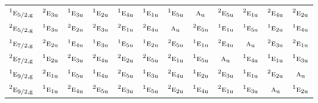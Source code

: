 \documentclass[10pt,a4paper]{article}
\numberwithin{equation}{section}
\newcommand{\irr}[1]{\text{\normalfont\scshape #1}}
\newcommand{\conjpair}[1]{{}^{#1}}
\newcommand{\ptag}[1]{\mathrm{#1}}
\begin{document}
{\begin{longtable}{@{}lccccccccccc@{}}
$\conjpair{1}\irr{e}_{5/2,\ptag{g}}$ & $\conjpair{2}\irr{e}_{3\ptag{u}}$ & $\conjpair{1}\irr{e}_{3\ptag{u}}$ & $\conjpair{1}\irr{e}_{2\ptag{u}}$ & $\conjpair{1}\irr{e}_{4\ptag{u}}$ & $\conjpair{1}\irr{e}_{1\ptag{u}}$ & $\conjpair{1}\irr{e}_{5\ptag{u}}$ & $\irr{a}_{\ptag{u}}$ & $\conjpair{2}\irr{e}_{5\ptag{u}}$ & $\conjpair{2}\irr{e}_{1\ptag{u}}$ & $\conjpair{2}\irr{e}_{4\ptag{u}}$ & $\conjpair{2}\irr{e}_{2\ptag{u}}$\\
$\conjpair{2}\irr{e}_{5/2,\ptag{g}}$ & $\conjpair{1}\irr{e}_{3\ptag{u}}$ & $\conjpair{2}\irr{e}_{2\ptag{u}}$ & $\conjpair{2}\irr{e}_{3\ptag{u}}$ & $\conjpair{2}\irr{e}_{1\ptag{u}}$ & $\conjpair{2}\irr{e}_{4\ptag{u}}$ & $\irr{a}_{\ptag{u}}$ & $\conjpair{2}\irr{e}_{5\ptag{u}}$ & $\conjpair{1}\irr{e}_{1\ptag{u}}$ & $\conjpair{1}\irr{e}_{5\ptag{u}}$ & $\conjpair{1}\irr{e}_{2\ptag{u}}$ & $\conjpair{1}\irr{e}_{4\ptag{u}}$\\
$\conjpair{1}\irr{e}_{7/2,\ptag{g}}$ & $\conjpair{2}\irr{e}_{2\ptag{u}}$ & $\conjpair{1}\irr{e}_{4\ptag{u}}$ & $\conjpair{1}\irr{e}_{3\ptag{u}}$ & $\conjpair{1}\irr{e}_{5\ptag{u}}$ & $\conjpair{1}\irr{e}_{2\ptag{u}}$ & $\conjpair{2}\irr{e}_{5\ptag{u}}$ & $\conjpair{1}\irr{e}_{1\ptag{u}}$ & $\conjpair{2}\irr{e}_{4\ptag{u}}$ & $\irr{a}_{\ptag{u}}$ & $\conjpair{2}\irr{e}_{3\ptag{u}}$ & $\conjpair{2}\irr{e}_{1\ptag{u}}$\\
$\conjpair{2}\irr{e}_{7/2,\ptag{g}}$ & $\conjpair{1}\irr{e}_{2\ptag{u}}$ & $\conjpair{2}\irr{e}_{3\ptag{u}}$ & $\conjpair{2}\irr{e}_{4\ptag{u}}$ & $\conjpair{2}\irr{e}_{2\ptag{u}}$ & $\conjpair{2}\irr{e}_{5\ptag{u}}$ & $\conjpair{2}\irr{e}_{1\ptag{u}}$ & $\conjpair{1}\irr{e}_{5\ptag{u}}$ & $\irr{a}_{\ptag{u}}$ & $\conjpair{1}\irr{e}_{4\ptag{u}}$ & $\conjpair{1}\irr{e}_{1\ptag{u}}$ & $\conjpair{1}\irr{e}_{3\ptag{u}}$\\
$\conjpair{1}\irr{e}_{9/2,\ptag{g}}$ & $\conjpair{2}\irr{e}_{1\ptag{u}}$ & $\conjpair{1}\irr{e}_{5\ptag{u}}$ & $\conjpair{1}\irr{e}_{4\ptag{u}}$ & $\conjpair{2}\irr{e}_{5\ptag{u}}$ & $\conjpair{1}\irr{e}_{3\ptag{u}}$ & $\conjpair{2}\irr{e}_{4\ptag{u}}$ & $\conjpair{1}\irr{e}_{2\ptag{u}}$ & $\conjpair{2}\irr{e}_{3\ptag{u}}$ & $\conjpair{1}\irr{e}_{1\ptag{u}}$ & $\conjpair{2}\irr{e}_{2\ptag{u}}$ & $\irr{a}_{\ptag{u}}$\\
$\conjpair{2}\irr{e}_{9/2,\ptag{g}}$ & $\conjpair{1}\irr{e}_{1\ptag{u}}$ & $\conjpair{2}\irr{e}_{4\ptag{u}}$ & $\conjpair{2}\irr{e}_{5\ptag{u}}$ & $\conjpair{2}\irr{e}_{3\ptag{u}}$ & $\conjpair{1}\irr{e}_{5\ptag{u}}$ & $\conjpair{2}\irr{e}_{2\ptag{u}}$ & $\conjpair{1}\irr{e}_{4\ptag{u}}$ & $\conjpair{2}\irr{e}_{1\ptag{u}}$ & $\conjpair{1}\irr{e}_{3\ptag{u}}$ & $\irr{a}_{\ptag{u}}$ & $\conjpair{1}\irr{e}_{2\ptag{u}}$\\

\end{longtable}}
\end{document}
